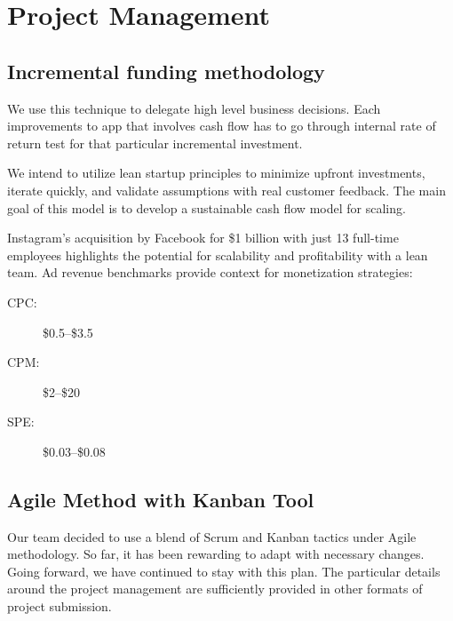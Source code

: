 %
%
\chapter{Project Management}


\section{Incremental funding methodology}

We use this technique to delegate high level business decisions. Each improvements to app that involves cash flow has to go through internal rate of return test for that particular incremental investment.

We intend to utilize lean startup principles to minimize upfront investments, iterate quickly, and validate assumptions with real customer feedback. The main goal of this model is to develop a sustainable cash flow model for scaling. \cite{2024_Lean_Startup}

Instagram's acquisition by Facebook for \$1 billion with just 13 full-time employees highlights the potential for scalability and profitability with a lean team. Ad revenue benchmarks provide context for monetization strategies: \cite{2012_IG_Acquisition}

\begin{description}
	\item[CPC:] \$0.5–\$3.5
	\item[CPM:] \$2–\$20
	\item[SPE:] \$0.03–\$0.08
\end{description}




\section{Agile Method with Kanban Tool}

Our team decided to use a blend of Scrum and Kanban tactics under Agile methodology. So far, it has been rewarding to adapt with necessary changes. Going forward, we have continued to stay with this plan. The particular details around the project management are sufficiently provided in other formats of project submission.

\clearpage